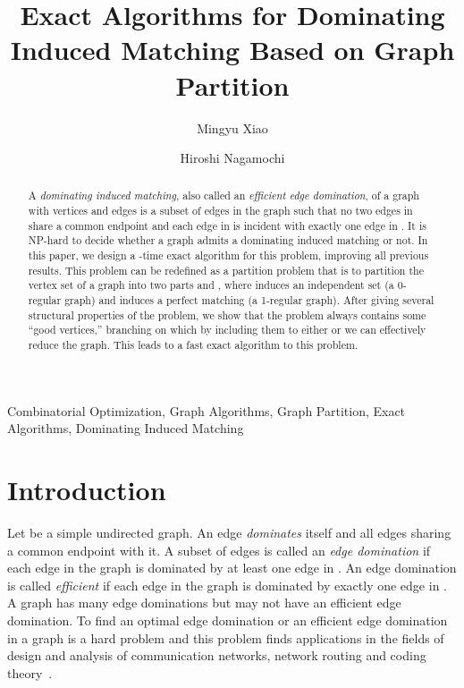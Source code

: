 \documentclass{elsart_TR2}
\begin{document}
\begin{frontmatter}
\title{Exact Algorithms for Dominating Induced Matching Based on Graph Partition}
\author{Mingyu Xiao}
\address{School of Computer Science and Engineering\\
University of Electronic Science and Technology of China\\
Chengdu 611731, China}
\author{Hiroshi Nagamochi}
\address{Department of Applied Mathematics and Physics\\
Graduate School of Informatics\\
Kyoto University\\
Yoshida Honmachi, Sakyo, Kyoto 606-8501, Japan}


\begin{abstract}
A \emph{dominating induced matching}, also called an \emph{efficient edge domination}, of a graph  with  vertices and  edges
is a subset  of edges in the graph such
that no two edges in  share a common endpoint and each edge in  is incident with exactly one edge in . It is NP-hard to decide whether a graph admits a dominating induced matching or not. In this paper, we design a -time exact algorithm for this problem, improving all previous results.
This problem can be redefined as a partition problem that is to partition the vertex set of a graph into two parts  and , where  induces an independent set (a 0-regular graph) and  induces
a perfect matching (a 1-regular graph).
After giving several structural properties of the problem, we show that the problem always contains some ``good vertices,'' branching on which by including them to either  or  we can effectively reduce the graph. This leads to a fast exact algorithm to this problem.

\end{abstract}


\begin{keyword}
Combinatorial Optimization, Graph Algorithms, Graph Partition, Exact Algorithms, Dominating Induced Matching
\end{keyword}
\end{frontmatter}




\section{Introduction}


Let  be a simple undirected graph. An edge  \emph{dominates} itself and all edges sharing a common endpoint with it.
A subset  of edges is called an \emph{edge domination} if each edge in the graph is dominated by at least one edge in .
An edge domination  is called \emph{efficient} if each edge in the graph is dominated by exactly one edge in .
A graph has many edge dominations but may not have an efficient edge domination.
To  find an optimal edge domination or an efficient edge domination in a graph is a hard problem and this problem finds
applications in the fields of design and analysis of communication networks, network routing and coding theory~\cite{CCDS:EEDRegularGraph,GSSH:EED}.
\end{document}
